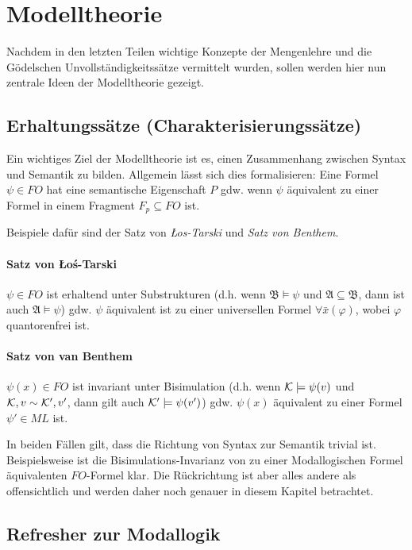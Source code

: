 \clearpage

\section{Modelltheorie}

Nachdem in den letzten Teilen wichtige Konzepte der Mengenlehre und die Gödelschen Unvollständigkeitssätze vermittelt wurden, sollen werden hier nun zentrale Ideen der Modelltheorie gezeigt.

\subsection{Erhaltungssätze (Charakterisierungssätze)}

Ein wichtiges Ziel der Modelltheorie ist es, einen Zusammenhang zwischen Syntax und Semantik zu bilden. Allgemein lässt sich dies formalisieren: Eine Formel $\psi\in FO$ hat eine semantische Eigenschaft $P$ gdw. wenn $\psi$ äquivalent zu einer Formel in einem Fragment $F_p\subseteq FO$ ist.

Beispiele dafür sind der Satz von \textit{\L os-Tarski} und \textit{Satz von Benthem}.

\paragraph{Satz von \L o\'{s}-Tarski}
$\psi\in FO$ ist erhaltend unter Substrukturen (d.h. wenn $\mathfrak{B}\models \psi$ und $\mathfrak{A}\subseteq\mathfrak{B}$, dann ist auch $\mathfrak{A}\models\psi$) gdw. $\psi$ äquivalent ist zu einer universellen Formel $\forall \bar{x}(\varphi)$, wobei $\varphi$ quantorenfrei ist.

\paragraph{Satz von van Benthem}
$\psi(x)\in FO$ ist invariant unter Bisimulation (d.h. wenn $\mathcal{K}\models \psi(v)$ und $\mathcal{K},v\sim \mathcal{K}',v'$, dann gilt auch $\mathcal{K}'\models \psi(v')$) gdw. $\psi(x)$ äquivalent zu einer Formel $\psi'\in ML$ ist.

In beiden Fällen gilt, dass die Richtung von Syntax zur Semantik trivial ist. Beispielsweise ist die Bisimulations-Invarianz von zu einer Modallogischen Formel äquivalenten $FO$-Formel klar. Die Rückrichtung ist aber alles andere als offensichtlich und werden daher noch genauer in diesem Kapitel betrachtet.

\subsection*{Refresher zur Modallogik}

